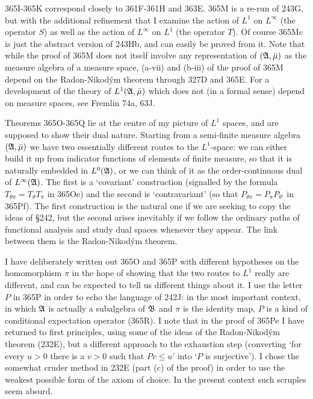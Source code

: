 {365I-365K %
correspond closely to 361F-361H %
and 363E.
365M is a re-run of 243G, but with the additional refinement that I
examine the action of $L^1$ on $L^{\infty}$ (the operator $S$) as well
as the action of $L^{\infty}$ on $L^1$ (the operator $T$).   Of course
365Mc is just the abstract version of 243Hb, and can easily be proved
from it.   Note that while the proof of 365M does not itself involve any
representation of $(\frak A,\bar\mu)$ as the measure algebra of a
measure space, (a-vii) and (b-iii) of the proof of 365M depend on the
Radon-Nikod\'ym theorem through 327D and 365E.   For a development of
the theory of $L^1(\frak A,\bar\mu)$ which does not (in a formal sense)
depend on measure spaces, see {\smc Fremlin 74a}, 63J.
     
Theorems 365O-365Q lie at the centre of my picture of $L^1$ spaces, and
are supposed to show their dual nature.   Starting from a semi-finite
measure algebra $(\frak A,\bar\mu)$ we have two essentially different
routes to the $L^1$-space:  we can either build it up from
indicator functions of elements of finite measure, so that it is
naturally embedded in $L^0(\frak A)$, or we can think of it as the
order-continuous dual of $L^{\infty}(\frak A)$.   The first is a
`covariant' construction (signalled by the formula
$T_{\theta\pi}=T_{\theta}T_{\pi}$ in 365Oe) and the second is
`contravariant' (so that $P_{\theta\pi}=P_{\pi}P_{\theta'}$ in
365Pf).   The first construction is the natural one if we are
seeking to copy the ideas of \S242, but the second arises inevitably if
we follow the ordinary paths of functional analysis and study dual
spaces whenever they appear.   The link between them is the
Radon-Nikod\'ym theorem.
     
I have deliberately written out 365O and 365P with different
hypotheses on the homomorphism $\pi$ in the hope of showing that the two
routes to $L^1$ really are different, and can be expected to tell us
different things about it.
I use the letter $P$ in 365P in order to echo the language of 242J:
in the most important context, in which $\frak A$ is actually a
subalgebra of $\frak B$ and $\pi$ is the identity map, $P$ is a kind of
conditional expectation operator (365R).   I note that in the proof of
365Pe I have returned to first principles, using some of the ideas of
the Radon-Nikod\'ym theorem (232E), but a different approach to the
exhaustion step (converting `for every $u>0$ there is a $v>0$ such
that $Pv\le u$' into `$P$ is surjective').   I chose the somewhat
cruder method in 232E (part (c) of the proof) in order to use the
weakest possible form of the axiom of choice.   In the present context
such scruples seem absurd.
     
}
